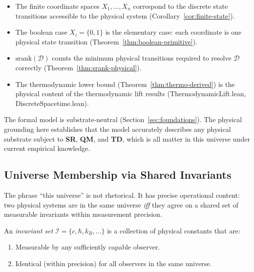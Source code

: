 \begin{itemize}
\item The finite coordinate spaces $X_1, \ldots, X_n$ correspond to the
  discrete state transitions accessible to the physical system
  (Corollary~\ref{cor:finite-state}).

\item The boolean case $X_i = \{0,1\}$ is the elementary case:
  each coordinate is one physical state transition
  (Theorem~\ref{thm:boolean-primitive}).

\item $\mathrm{srank}(\mathcal{D})$ counts the minimum physical transitions
  required to resolve $\mathcal{D}$ correctly
  (Theorem~\ref{thm:srank-physical}).

\item The thermodynamic lower bound (Theorem~\ref{thm:thermo-derived})
  is the physical content of the thermodynamic lift results
  (ThermodynamicLift.lean, DiscreteSpacetime.lean).
\end{itemize}

The formal model is substrate-neutral (Section~\ref{sec:foundations}).
The physical grounding here establishes that the model accurately describes
any physical substrate subject to \textbf{SR}, \textbf{QM}, and \textbf{TD},
which is all matter in this universe under current empirical knowledge.

\subsection{Universe Membership via Shared Invariants}\label{sec:universe-membership}

The phrase ``this universe'' is not rhetorical. It has precise operational content:
two physical systems are in the same universe \emph{iff} they agree on a shared
set of measurable invariants within measurement precision.

\begin{definition}\label{def:invariant-set}
An \emph{invariant set} $\mathcal{I} = \{c, \hbar, k_B, \ldots\}$ is a collection
of physical constants that are:
\begin{enumerate}
\item Measurable by any sufficiently capable observer.
\item Identical (within precision) for all observers in the same universe.
\end{enumerate}
\end{definition}

